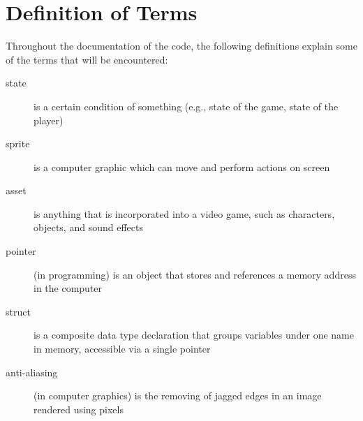 \section{Definition of Terms}

Throughout the documentation of the code, the following definitions explain
some of the terms that will be encountered:

\begin{description}
    \item[state]{is a certain condition of something (e.g., state of the game, state of the player)}
    \item[sprite]{is a computer graphic which can move and perform actions on screen}
    \item[asset]{is anything that is incorporated into a video game, such as characters, objects, and sound effects}
    \item[pointer]{(in programming) is an object that stores and references a memory address in the computer}
    \item[struct]{is a composite data type declaration that groups variables under one name in memory, accessible via a single pointer} 
    \item[anti-aliasing]{(in computer graphics) is the removing of jagged edges in an image rendered using pixels}
\end{description}
